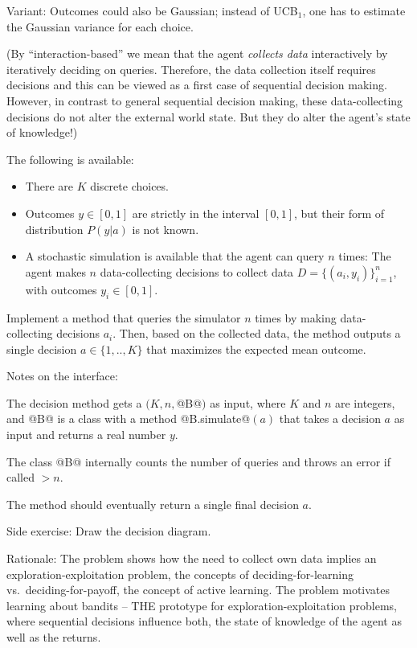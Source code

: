 Variant: Outcomes could also be Gaussian; instead of UCB${}_1$, one has to estimate the Gaussian variance for each choice.


\label{secBandits}

(By ``interaction-based'' we mean that the agent \emph{collects data} interactively by iteratively deciding on queries. Therefore, the data collection itself requires decisions and this can be viewed as a first case of sequential decision making. However, in contrast to general sequential decision making, these data-collecting decisions do not alter the external world state. But they do alter the agent's state of knowledge!)

The following is available:
\begin{itemize}
\item There are $K$ discrete choices.
\item Outcomes $y\in[0,1]$ are strictly in the interval $[0,1]$, but their form of distribution $P(y|a)$ is not known.
\item A stochastic simulation is available that the agent can query $n$ times: The agent makes $n$ data-collecting decisions to collect data $D=\{(a_i, y_i)\}_{i=1}^n$, with outcomes $y_i\in[0,1]$.
\end{itemize}

Implement a method that queries the simulator $n$ times by making data-collecting decisions $a_i$. Then, based on the collected data, the method outputs a single decision $a\in\{1,..,K\}$ that maximizes the expected mean outcome.

Notes on the interface:
\begin{items}
\item The decision method gets a $(K, n, $@B@$)$ as input, where $K$ and $n$ are integers, and @B@ is a class with a method @B.simulate@$(a)$ that takes a decision $a$ as input and returns a real number $y$.
\item The class @B@ internally counts the number of queries and throws an error if called $>n$.
\item The method should eventually return a single final decision $a$.
\end{items}

Side exercise: Draw the decision diagram. 

Rationale: The problem shows how the need to collect own data implies
an exploration-exploitation problem, the concepts of
deciding-for-learning vs.\ deciding-for-payoff, the concept of active
learning. The problem motivates learning about bandits -- THE
prototype for exploration-exploitation problems, where sequential
decisions influence both, the state of knowledge of the agent as well
as the returns.

